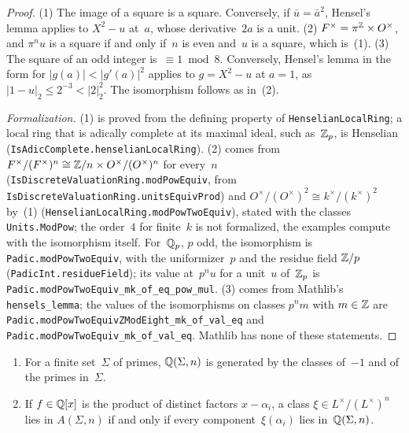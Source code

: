 \begin{proof}
\leanok
(1) The image of a square is a square. Conversely, if $\bar u = \bar a^2$, Hensel's lemma applies
to $X^2 - u$ at~$a$, whose derivative~$2a$ is a unit. (2) $F^\times = \pi^{\mathbb{Z}} \times O^\times$,
and $\pi^n u$ is a square if and only if~$n$ is even and~$u$ is a square, which is~(1). (3) The
square of an odd integer is~$\equiv 1 \bmod 8$. Conversely, Hensel's lemma in the form for
$\lvert g(a)\rvert < \lvert g'(a)\rvert^2$ applies to $g = X^2 - u$ at $a = 1$, as
$\lvert 1 - u\rvert_2 \le 2^{-3} < \lvert 2\rvert_2^2$. The isomorphism follows as in~(2).

\emph{Formalization.} (1) is proved from the defining property of \texttt{HenselianLocalRing}; a
local ring that is adically complete at its maximal ideal, such as~$\mathbb{Z}_p$, is Henselian
(\texttt{IsAdicComplete.henselianLocalRing}). (2) comes from
$F^\times/(F^\times)^n \cong \mathbb{Z}/n \times O^\times/(O^\times)^n$ for every~$n$
(\texttt{IsDiscreteValuationRing.modPowEquiv}, from \texttt{IsDiscreteValuationRing.unitsEquivProd})
and $O^\times/(O^\times)^2 \cong k^\times/(k^\times)^2$ by~(1)
(\texttt{HenselianLocalRing.modPowTwoEquiv}), stated with the classes \texttt{Units.ModPow}; the
order~$4$ for finite~$k$ is not formalized, the examples compute with the isomorphism itself.
For~$\mathbb{Q}_p$, $p$ odd, the isomorphism is \texttt{Padic.modPowTwoEquiv}, with the uniformizer~$p$
and the residue field $\mathbb{Z}/p$ (\texttt{PadicInt.residueField}); its value at~$p^n u$ for a unit~$u$
of~$\mathbb{Z}_p$ is \texttt{Padic.modPowTwoEquiv\_mk\_of\_eq\_pow\_mul}. (3) comes from Mathlib's
\texttt{hensels\_lemma}; the values of the isomorphisms on classes $p^n m$ with $m \in \mathbb{Z}$ are
\texttt{Padic.modPowTwoEquivZModEight\_mk\_of\_val\_eq} and
\texttt{Padic.modPowTwoEquiv\_mk\_of\_val\_eq}. Mathlib has none of these statements.
\end{proof}

\begin{lemma}
\label{lem:ds-e1-selmer}
\leanok
{}
\begin{enumerate}
  \item For a finite set~$\Sigma$ of primes, $\mathbb{Q}(\Sigma, n)$ is generated by the classes of~$-1$
    and of the primes in~$\Sigma$.
  \item If $f \in \mathbb{Q}[x]$ is the product of distinct factors $x - \alpha_i$, a class
    $\xi \in L^\times/(L^\times)^n$ lies in $A(\Sigma, n)$ if and only if every
    component~$\xi(\alpha_i)$ lies in~$\mathbb{Q}(\Sigma, n)$.
\end{enumerate}
\end{lemma}

